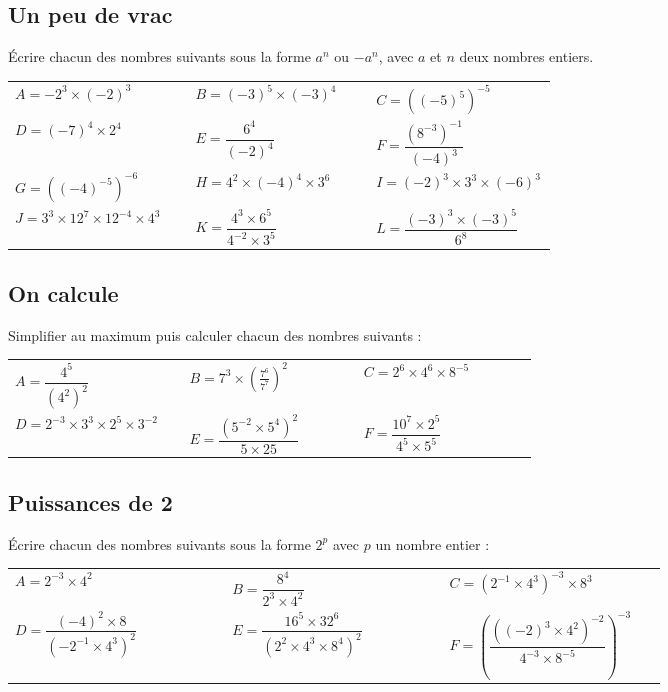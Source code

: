 \documentclass[oneside,12pt]{article}          %
\begin{document}
\subsection{Un peu de vrac}
Écrire chacun des nombres suivants sous la forme $a^n$ ou $-a^n$, avec $a$ et $n$ deux nombres entiers.

\renewcommand{\arraystretch}{2}
\begin{tabular}{p{0.33\linewidth} p{0.33\linewidth} p{0.33\linewidth}}
    $A=-2^3\times(-2)^3$ &
    $B=(-3)^5\times(-3)^4$ &
    $C=\left((-5)^5\right)^{-5}$ \\
    $D=(-7)^4\times2^4$ &
    $E=\dfrac{6^4}{(-2)^4}$ &
    $F=\dfrac{(8^{-3})^{-1}}{(-4)^3}$ \\
    $G=\left((-4)^{-5}\right)^{-6}$ &
    $H=4^2\times(-4)^4\times3^6$ &
    $I=(-2)^3\times3^3\times(-6)^3$ \\
    $J=3^3\times12^7\times12^{-4}\times4^3$ &
    $K=\dfrac{4^3\times6^5}{4^{-2}\times3^5}$ &
    $L=\dfrac{(-3)^3\times(-3)^5}{6^8}$
\end{tabular}



\subsection{On calcule}
Simplifier au maximum puis calculer chacun des nombres suivants :

\renewcommand{\arraystretch}{2.5}
\begin{tabular}{p{0.3\linewidth} p{0.3\linewidth} p{0.3\linewidth}}
    $A=\dfrac{4^5}{(4^2)^2}$ &
    $B=7^3\times\left(\frac{7^6}{7^7}\right)^2$ &
    $C=2^6\times4^6\times8^{-5}$ \\
    $D=2^{-3}\times3^3\times2^5\times3^{-2}$ &
    $E=\dfrac{\left(5^{-2}\times5^4\right)^2}{5\times25}$ &
    $F=\dfrac{10^7\times2^5}{4^5\times5^5}$
\end{tabular}



\subsection{Puissances de 2}
Écrire chacun des nombres suivants sous la forme $2^p$ avec $p$ un nombre entier :

\renewcommand{\arraystretch}{2.1}
\begin{tabular}{p{0.3\linewidth} p{0.3\linewidth} p{0.3\linewidth}}
    $A=2^{-3}\times4^2$ &
    $B= \dfrac{8^4}{2^3\times4^2}$ &
    $C=\left(2^{-1}\times4^3\right)^{-3}\times8^3$ \\
    $D=\dfrac{(-4)^2\times8}{\left(-2^{-1}\times4^3\right)^2}$ &
    $E=\dfrac{16^5\times32^6}{\left(2^2\times4^3\times8^4\right)^2}$ &
    $F=\left(\dfrac{\left((-2)^3\times4^2\right)^{-2}}{4^{-3}\times8^{-5}}\right)^{-3}$
\end{tabular}
\end{document}
